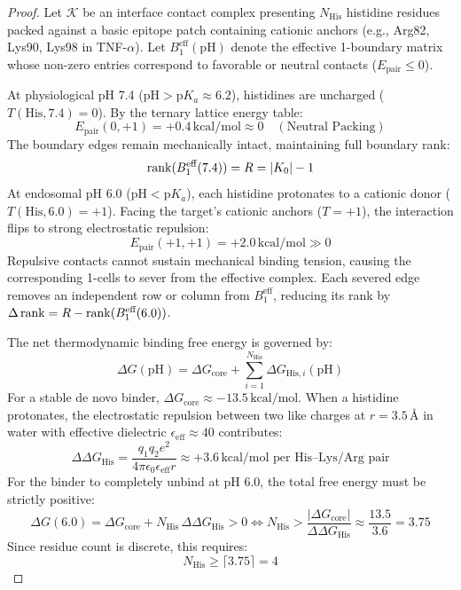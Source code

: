 \begin{proof}
Let $\mathcal{K}$ be an interface contact complex presenting $N_{\text{His}}$ histidine residues packed against a basic epitope patch containing cationic anchors (e.g., Arg82, Lys90, Lys98 in TNF-$\alpha$). Let $B_1^{\text{eff}}(\text{pH})$ denote the effective 1-boundary matrix whose non-zero entries correspond to favorable or neutral contacts ($E_{\text{pair}} \le 0$).

At physiological pH 7.4 ($\text{pH} > \mathrm{p}K_a \approx 6.2$), histidines are uncharged ($T(\text{His}, 7.4) = 0$). By the ternary lattice energy table:
\begin{equation}
    E_{\text{pair}}(0, +1) = +0.4\,\text{kcal/mol} \approx 0 \quad (\text{Neutral Packing})
\end{equation}
The boundary edges remain mechanically intact, maintaining full boundary rank:
\begin{equation}
    \operatorname{rank}(B_1^{\text{eff}}(7.4)) = R = |K_0| - 1
\end{equation}
At endosomal pH 6.0 ($\text{pH} < \mathrm{p}K_a$), each histidine protonates to a cationic donor ($T(\text{His}, 6.0) = +1$). Facing the target's cationic anchors ($T = +1$), the interaction flips to strong electrostatic repulsion:
\begin{equation}
    E_{\text{pair}}(+1, +1) = +2.0\,\text{kcal/mol} \gg 0
\end{equation}
Repulsive contacts cannot sustain mechanical binding tension, causing the corresponding 1-cells to sever from the effective complex. Each severed edge removes an independent row or column from $B_1^{\text{eff}}$, reducing its rank by $\Delta\operatorname{rank} = R - \operatorname{rank}(B_1^{\text{eff}}(6.0))$.

The net thermodynamic binding free energy is governed by:
\begin{equation}
    \Delta G(\text{pH}) = \Delta G_{\text{core}} + \sum_{i=1}^{N_{\text{His}}} \Delta G_{\text{His}, i}(\text{pH})
\end{equation}
For a stable de novo binder, $\Delta G_{\text{core}} \approx -13.5\,\text{kcal/mol}$. When a histidine protonates, the electrostatic repulsion between two like charges at $r = 3.5\,\text{\AA}$ in water with effective dielectric $\epsilon_{\text{eff}} \approx 40$ contributes:
\begin{equation}
    \Delta\Delta G_{\text{His}} = \frac{q_1 q_2 e^2}{4\pi \epsilon_0 \epsilon_{\text{eff}} r} \approx +3.6\,\text{kcal/mol per His--Lys/Arg pair}
\end{equation}
For the binder to completely unbind at pH 6.0, the total free energy must be strictly positive:
\begin{equation}
    \Delta G(6.0) = \Delta G_{\text{core}} + N_{\text{His}} \, \Delta\Delta G_{\text{His}} > 0 \iff N_{\text{His}} > \frac{|\Delta G_{\text{core}}|}{\Delta\Delta G_{\text{His}}} \approx \frac{13.5}{3.6} = 3.75
\end{equation}
Since residue count is discrete, this requires:
\begin{equation}
    N_{\text{His}} \ge \lceil 3.75 \rceil = 4
\end{equation}


\end{proof}
